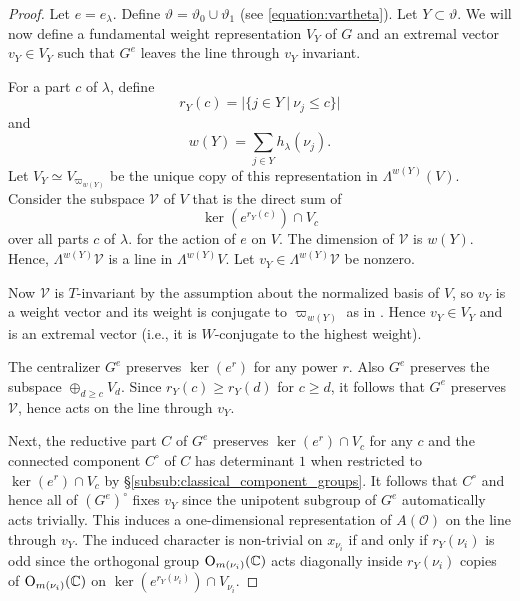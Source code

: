 \documentclass{amsart}
\theoremstyle{definition}
\newcommand{\C}{\mathbb{C}}
\newcommand{\0}{\mathcal{O}}
\begin{document}
\begin{proof}
Let $e = e_\lambda$. Define $\vartheta = \vartheta_0 \cup \vartheta_1$
(see \eqref{equation:vartheta}).
Let $Y \subset \vartheta$.
We will now define a fundamental weight representation $V_Y$ of $G$
and an extremal vector $v_Y \in V_Y$ such that 
$G^e$ leaves the line through $v_Y$ invariant.

For a part $c$ of $\lambda$, define 
$$r_Y(c)= |\{j \in Y \ | \ \nu_j \leq c \}|$$
and 
$$w(Y) = \sum_{j \in Y } h_\lambda(\nu_j).$$
Let $V_Y \simeq V_{\varpi_{w(Y)}}$ 
be the unique copy of this representation in $\Lambda^{w(Y)}(V)$.
Consider the subspace $\mathcal V$ of $V$ that is the direct sum of
\begin{equation} \label{equation:subspace}
\ker(e^{r_Y(c)}) \cap V_c %
\end{equation}
over all parts $c$ of $\lambda$.
for the action of $e$ on $V$.
The dimension of $\mathcal V$ is $w(Y)$.  
Hence,  $\Lambda^{w(Y)}\mathcal V$ is a line in $\Lambda^{w(Y)}V$. 
Let $v_Y \in\Lambda^{w(Y)}\mathcal V$ be nonzero.  

Now $\mathcal V$ is $T$-invariant by the assumption about
the normalized basis of $V$, so $v_Y$ is a weight vector 
and its weight is conjugate to $\varpi_{w(Y)}$ as in \cite{Sommers:Localsystems}.  
Hence $v_Y \in V_Y$ and is an extremal vector (i.e., it is $W$-conjugate to the highest weight).

The centralizer $G^e$ preserves $\ker(e^{r})$ for any power $r$.
Also $G^e$ preserves the subspace $\oplus_{d \geq c} V_{d}$. 
Since $r_Y(c) \geq r_Y(d)$ for $c \geq d$, 
it follows that $G^e$ preserves $\mathcal V$, hence acts on 
the line through $v_Y$.

Next, the reductive part $C$ of $G^e$ preserves $\ker(e^{r}) \cap  V_c$ for any $c$ and the connected component $C^\circ$ of $C$ has determinant $1$
when restricted to $\ker(e^{r}) \cap  V_c$ by \S\ref{subsub:classical_component_groups}.
It follows that $C^\circ$ and hence all of $(G^e)^\circ$ 
fixes $v_Y$ since the unipotent subgroup of $G^e$ automatically acts trivially.
This induces a one-dimensional representation of 
$A(\0)$ on the line through $v_Y$.
The induced character is non-trivial 
on $x_{\nu_i}$ if and only if $r_Y(\nu_i)$ is odd
since the orthogonal group ${\rm O}_{m(\nu_i)}(\C)$
acts diagonally inside $r_Y(\nu_i)$ copies of ${\rm O}_{m(\nu_i)}(\C)$ 
on $\ker(e^{r_Y(\nu_i)}) \cap  V_{\nu_i}$. 



\end{proof}
\end{document}
